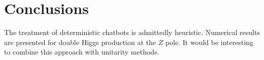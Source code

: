 \section{Conclusions}\label{sec:conclusions}

The treatment of deterministic chatbots is admittedly heuristic.
Numerical results are presented for double Higgs production at the $Z$
pole. It would be interesting to combine this approach with unitarity
methods.

